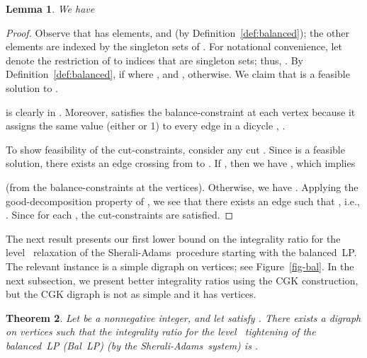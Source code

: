 \documentclass[11pt]{article}
\newtheorem{theorem}{Theorem}[section]
\newtheorem{lemma}[theorem]{Lemma}
\newcommand{\sa}{\textsf{Sherali-Adams}}
\begin{document}
\begin{lemma}
\label{lemma:base}
We have \qquad

\end{lemma}
\begin{proof}
Observe that  has  elements,
and 
(by Definition~\ref{def:balanced});
the other  elements are indexed by
the singleton sets of .
For notational convenience, let  denote
the restriction of  to
indices that are singleton sets;
thus, .
By Definition~\ref{def:balanced},
 if  where ,
and , otherwise.
We claim that  is a feasible solution to .

 is clearly in .
Moreover,  satisfies the balance-constraint at each vertex because it
assigns the same value (either  or 1) to every edge in a dicycle
, .


To show feasibility of the cut-constraints, consider any cut . Since  is a feasible solution, there
exists an edge  crossing from  to . If , then we have , which implies

(from the balance-constraints at the vertices).
 Otherwise, we have .
Applying the good-decomposition property of ,
we see that there exists an edge
 such that , i.e., . Since  for each , the  cut-constraints
 are satisfied.
\end{proof}

The next result presents our first lower bound on the integrality ratio for
the level~ relaxation of the \sa\ procedure starting with the balanced~LP.
The relevant instance is a simple digraph on  vertices;
see Figure~\ref{fig-bal}.
In the next subsection, we present better integrality ratios
using the CGK construction,
but the CGK digraph is not as simple and it has  vertices.

\begin{theorem}\label{thm:sgbalIR}
Let  be a nonnegative integer, and let 
satisfy .
There exists a digraph on  vertices
such that the integrality ratio for
the level~ tightening of the balanced~LP (Bal~LP)
(by the \sa\ system)
is .
\end{theorem}
\end{document}
